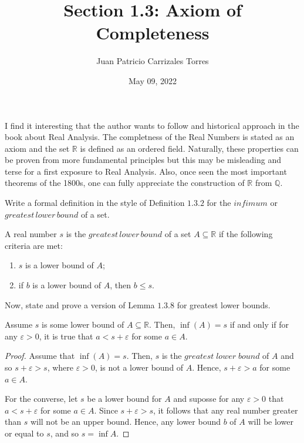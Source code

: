 \documentclass[12pt]{article}
\newcommand{\R}{\mathbb{R}}
\newcommand{\Q}{\mathbb{Q}}
\newenvironment{problem}[2][Problem]{\begin{trivlist}
		\item[\hskip \labelsep {\bfseries #1}\hskip \labelsep {\bfseries #2.}]}{\end{trivlist}}
\newenvironment{solution}[2][Solution]{\begin{trivlist}
		\item[\hskip \labelsep {\bfseries #1}\hskip \labelsep {\bfseries #2.}]}{\end{trivlist}}
\begin{document}
	
	\title{Section 1.3: Axiom of Completeness}
	\author{Juan Patricio Carrizales Torres}
	\date{May 09, 2022}
	\maketitle
	
	I find it interesting that the author wants to follow and historical approach in the book about Real Analysis. The completness of the Real Numbers is stated as an axiom and the set $\R$ is defined as an ordered field. Naturally, these properties can be proven from more fundamental principles but this may be misleading and terse for a first exposure to Real Analysis. Also, once seen the most important theorems of the 1800s, one can fully appreciate the construction of $\R$ from $\Q$. \\
	
	\begin{problem}{1.3.1}
		\begin{enumerate}[label=(\alph*)]
			\item Write a formal definition in the style of Definition $1.3.2$ for the $infimum$ or $greatest \, lower \, bound$ of a set. 
			\begin{solution}{a}
				A real number $s$ is the $greatest \, lower \, bound$ of a set $A\subseteq \R$ if the following criteria are met:
				\begin{enumerate}[label=\arabic*)]
					\item $s$ is a lower bound of $A$;
					\item if $b$ is a lower bound of $A$, then $b\leq s$.
				\end{enumerate}
			\end{solution}
			\item Now, state and prove a version of Lemma $1.3.8$ for greatest lower bounds. 
			\begin{solution}{b}
				Assume $s$ is some lower bound of $A\subseteq \R$. Then, $\inf(A) = s$ if and only if for any $\varepsilon > 0$, it is true that $a< s+\varepsilon$ for some $a\in A$.
				\begin{proof}
					Assume that $\inf(A) = s$. Then, $s$ is the $greatest \; lower \; bound$ of $A$ and so $s+\varepsilon > s$, where $\varepsilon>0$, is not a lower bound of $A$. Hence, $s+\varepsilon > a$ for some $a\in A$.
					 
					For the converse, let $s$ be a lower bound for $A$ and suposse for any $\varepsilon>0$ that $a< s+\varepsilon$ for some $a \in A$. Since $s+\varepsilon > s$, it follows that any real number greater than $s$ will not be an upper bound. Hence, any lower bound $b$ of $A$ will be lower or equal to $s$, and so $s = \inf A$.
				\end{proof}
			\end{solution}
		\end{enumerate}
	\end{problem}
\end{document}
